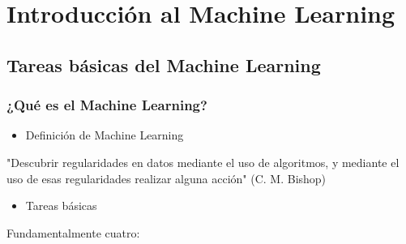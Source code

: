 \section{Introducción al Machine Learning}
\subsection{Tareas básicas del Machine Learning}
\subsubsection*{¿Qué es el Machine Learning?}
\begin{itemize}[label=\color{red}\textbullet, leftmargin=*]
	\item \color{lightblue}Definición de Machine Learning
\end{itemize}
"Descubrir regularidades en datos mediante el uso de algoritmos, y mediante el uso de esas regularidades realizar alguna acción" (C. M. Bishop)
\begin{itemize}[label=\color{red}\textbullet, leftmargin=*]
	\item \color{lightblue}Tareas básicas
\end{itemize}
Fundamentalmente cuatro:
